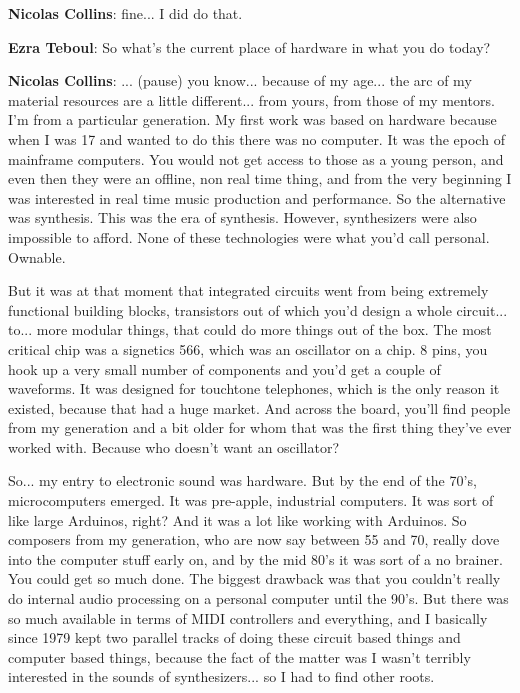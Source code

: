 \textbf{Nicolas Collins}: fine... I did do that.

\textbf{Ezra Teboul}: So what’s the current place of hardware in what you do today?
					
\textbf{Nicolas Collins}: ... (pause) you know... because of my age... the arc of my material resources are a little different... from yours, from those of my mentors. I’m from a particular generation. My first work was based on hardware because when I was 17 and wanted to do this there was no computer. It was the epoch of mainframe computers. You would not get access to those as a young person, and even then they were an offline, non real time thing, and from the very beginning I was interested in real time music production and performance. So the alternative was synthesis. This was the era of synthesis. However, synthesizers were also impossible to afford. None of these technologies were what you’d call personal. Ownable.
					
But it was at that moment that integrated circuits went from being extremely functional building blocks, transistors out of which you’d design a whole circuit... to... more modular things, that could do more things out of the box. The most critical chip was a signetics 566, which was an oscillator on a chip. 8 pins, you hook up a very small number of components and you’d get a couple of waveforms. It was designed for touchtone telephones, which is the only reason it existed, because that had a huge market. And across the board, you’ll find people from my generation and a bit older for whom that was the first thing they’ve ever worked with. Because who doesn’t want an oscillator?
					
So... my entry to electronic sound was hardware. But by the end of the 70’s, microcomputers emerged. It was pre-apple, industrial computers. It was sort of like large Arduinos, right? And it was a lot like working with Arduinos. So composers from my generation, who are now say between 55 and 70, really dove into the computer stuff early on, and by the mid 80’s it was sort of a no brainer. You could get so much done. The biggest drawback was that you couldn’t really do internal audio processing on a personal computer until the 90’s. But there was so much available in terms of MIDI controllers and everything, and I basically since 1979 kept two parallel tracks of doing these circuit based things and computer based things, because the fact of the matter was I wasn’t terribly interested in the sounds of synthesizers... so I had to find other roots.
					
